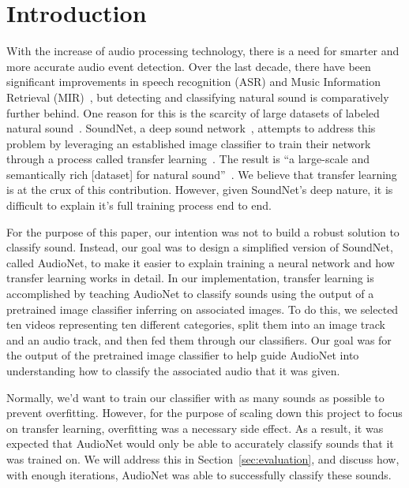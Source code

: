 \documentclass[12pt,twoside]{article}
\theoremstyle{plain}
\theoremstyle{definition}
\theoremstyle{remark}
\begin{document}
\setcounter{tocdepth}{2}           %
\tableofcontents
{}
\clearpage




\section{Introduction}
\label{sec:introduction}
With the increase of audio processing technology, there is a need for smarter and more accurate audio event detection.
Over the last decade, there have been significant improvements in speech recognition (ASR) and Music Information Retrieval (MIR)~\cite{Stowell:2015}, but detecting and classifying natural sound is comparatively further behind.
One reason for this is the scarcity of large datasets of labeled natural sound~\cite{Aytar:Yusuf:16}.
SoundNet, a deep sound network~\cite{Aytar:Yusuf:16}, attempts to address this problem by leveraging an established image classifier to train their network through a process called transfer learning~\cite{Yosinski:2014}.
The result is “a large-scale and semantically rich [dataset] for natural sound”~\cite{Aytar:Yusuf:16}.
We believe that transfer learning is at the crux of this contribution.
However, given SoundNet’s deep nature, it is difficult to explain it’s full training process end to end.

For the purpose of this paper, our intention was not to build a robust solution to classify sound.
Instead, our goal was to design a simplified version of SoundNet, called AudioNet, to make it easier to explain training a neural network and how transfer learning works in detail.
In our implementation, transfer learning is accomplished by teaching AudioNet to classify sounds using the output of a pretrained image classifier inferring on associated images.
To do this, we selected ten videos representing ten different categories, split them into an image track and an audio track, and then fed them through our classifiers.
Our goal was for the output of the pretrained image classifier to help guide AudioNet into understanding how to classify the associated audio that it was given.

Normally, we’d want to train our classifier with as many sounds as possible to prevent overfitting.
However, for the purpose of scaling down this project to focus on transfer learning, overfitting was a necessary side effect.
As a result, it was expected that AudioNet would only be able to accurately classify sounds that it was trained on.
We will address this in Section~\ref{sec:evaluation}, and discuss how, with enough iterations, AudioNet was able to successfully classify these sounds.
\end{document}
